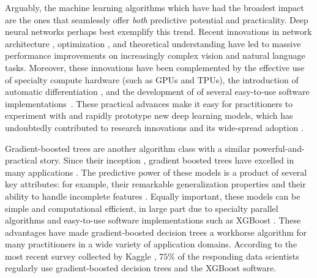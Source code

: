 Arguably, the machine learning algorithms which have had the broadest impact are the ones that seamlessly offer \emph{both} predictive potential and practicality.
Deep neural networks perhaps best exemplify this trend.
Recent innovations in
network architecture \citep[e.g.][]{krizhevsky2012imagenet,he2016deep,vaswani2017attention,devlin2018bert,huang2019convolutional},
optimization \citep[e.g.][]{hochreiter1997flat,bottou2010large,ioffe2015batch,izmailov2018averaging},
and theoretical understanding \citep[e.g.][]{keskar2016large,zhang2016understanding,}
have led to massive performance improvements on increasingly complex vision and natural language tasks.
Moreover, these innovations have been complemented by
the effective use of specialty compute hardware (such as GPUs and TPUs),
the introduction of automatic differentiation \citep[e.g.][]{paszke2017automatic},
and the development of of several easy-to-use software implementations~\citep[e.g.][]{jia2014caffe,chen2015mxnet,abadi2016tensorflow,paszke2019pytorch}.
These practical advances make it easy for practitioners to experiment with and rapidly prototype new deep learning models, which has undoubtedly contributed to research innovations and its wide-spread adoption \cite{goodfellow2016deep}.

Gradient-boosted trees are another algorithm class with a similar powerful-and-practical story.
Since their inception \cite{friedman2001greedy,friedman2002stochastic}, gradient boosted trees have excelled in many applications \citep[e.g.][]{richardson2007predicting,burges2010ranknet,li2010robust}.
The predictive power of these models is a product of several key attributes: for example, their remarkable generalization properties \citep{freund1997decision,schapire2013boosting} and their ability to handle incomplete features \cite{friedman2001greedy}.
Equally important, these models can be simple and computational efficient, in large part due to specialty parallel algorithms \citep[e.g.][]{panda2009planet,tyree2011parallel,ke2017lightgbm} and easy-to-use software implementations such as XGBoost \cite{chen2016xgboost}.
These advantages have made gradient-boosted decision trees a workhorse algorithm for many practitioners in a wide variety of application domains.
According to the most recent survey collected by Kaggle \cite{kaggle2019kaggle}, $75\%$ of the responding data scientists regularly use gradient-boosted decision trees and the XGBoost software.

